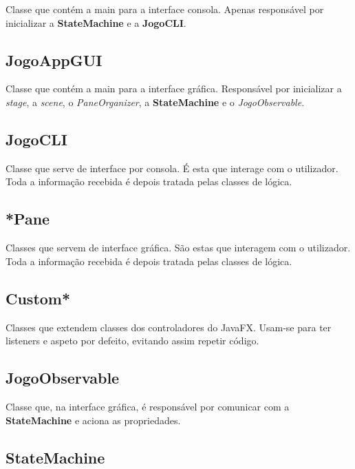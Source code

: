 \documentclass[11pt]{article}
\begin{document}
	Classe que contém a main para a interface consola. Apenas responsável por inicializar a \textbf{StateMachine} e a \textbf{JogoCLI}.
	
	
	\large
	\subsection{JogoAppGUI}
	\normalsize
	
	Classe que contém a main para a interface gráfica. Responsável por inicializar a \textit{stage}, a \textit{scene}, o \textit{PaneOrganizer}, a \textbf{StateMachine} e o \textit{JogoObservable}.
	
	
	\large
	\subsection{JogoCLI}
	\normalsize
	
	Classe que serve de interface por consola. É esta que interage com o utilizador. Toda a informação recebida é depois tratada pelas classes de lógica.
	
	
	\large
	\subsection{*Pane}
	\normalsize
	
	Classes que servem de interface gráfica. São estas que interagem com o utilizador. Toda a informação recebida é depois tratada pelas classes de lógica.
	
	
	\large
	\subsection{Custom*}
	\normalsize
	
	Classes que extendem classes dos controladores do JavaFX. Usam-se para ter listeners e aspeto por defeito, evitando assim repetir código.
	
	
	\large
	\subsection{JogoObservable}
	\normalsize
	
	Classe que, na interface gráfica, é responsável por comunicar com a \textbf{StateMachine} e aciona as propriedades.
	
	
	\large
	\subsection{StateMachine}
	\normalsize
	
\end{document}
